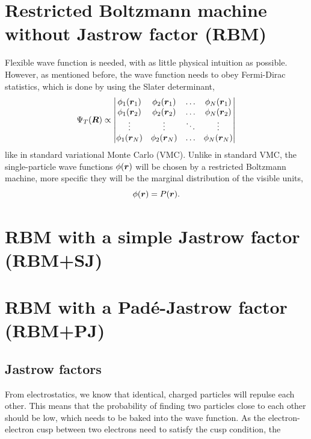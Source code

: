 \section{Restricted Boltzmann machine without Jastrow factor (RBM)} \label{sec:rbm}
Flexible wave function is needed, with as little physical intuition as possible. However, as mentioned before, the wave function needs to obey Fermi-Dirac statistics, which is done by using the Slater determinant,
\begin{equation}
\Psi_T(\boldsymbol{{R}})\propto
\begin{vmatrix}
\phi_1(\boldsymbol{r}_1) & \phi_2(\boldsymbol{r}_1) & \hdots & \phi_N(\boldsymbol{r}_1)\\
\phi_1(\boldsymbol{r}_2) & \phi_2(\boldsymbol{r}_2) & \hdots & \phi_N(\boldsymbol{r}_2)\\
\vdots & \vdots & \ddots & \vdots \\
\phi_1(\boldsymbol{r}_N) & \phi_2(\boldsymbol{r}_N) & \hdots & \phi_N(\boldsymbol{r}_N)
\end{vmatrix}
\end{equation}
like in standard variational Monte Carlo (VMC). Unlike in standard VMC, the single-particle wave functions $\phi(\boldsymbol{{r}})$ will be chosen by a restricted Boltzmann machine, more specific they will be the marginal distribution of the visible units,
\begin{equation}
\phi(\boldsymbol{{r}})=P(\boldsymbol{{r}}).
\end{equation}

\section{RBM with a simple Jastrow factor (RBM+SJ)}

\section{RBM with a Padé-Jastrow factor (RBM+PJ)}

\subsection{Jastrow factors}
From electrostatics, we know that identical, charged particles will repulse each other. This means that the probability of finding two particles close to each other should be low, which needs to be baked into the wave function. As the electron-electron cusp between two electrons need to satisfy the cusp condition, the 

